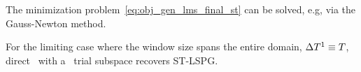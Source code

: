  
The minimization problem~\eqref{eq:obj_gen_lms_final_st} can be solved, e.g, via the Gauss-Newton method.

\begin{remark}
For the limiting case where the window size spans the entire domain, $\Delta T^{1}\equiv T$, direct \methodAcronym\ with a \spaceTimeAcronym\ trial subspace recovers ST-LSPG.
\end{remark}

